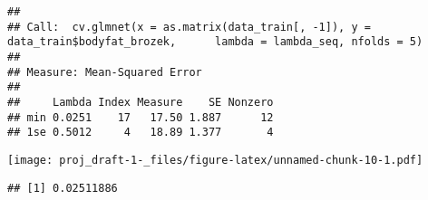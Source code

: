\documentclass[
]{article}
\newenvironment{Shaded}{\begin{snugshade}}{\end{snugshade}}
\newcommand{\AttributeTok}[1]{\textcolor[rgb]{0.77,0.63,0.00}{#1}}
\newcommand{\DecValTok}[1]{\textcolor[rgb]{0.00,0.00,0.81}{#1}}
\newcommand{\FunctionTok}[1]{\textcolor[rgb]{0.00,0.00,0.00}{#1}}
\newcommand{\NormalTok}[1]{#1}
\newcommand{\OtherTok}[1]{\textcolor[rgb]{0.56,0.35,0.01}{#1}}
\newcommand{\SpecialCharTok}[1]{\textcolor[rgb]{0.00,0.00,0.00}{#1}}
\begin{document}
\begin{Shaded}
\end{Shaded}

\begin{verbatim}
## 
## Call:  cv.glmnet(x = as.matrix(data_train[, -1]), y = data_train$bodyfat_brozek,      lambda = lambda_seq, nfolds = 5) 
## 
## Measure: Mean-Squared Error 
## 
##     Lambda Index Measure    SE Nonzero
## min 0.0251    17   17.50 1.887      12
## 1se 0.5012     4   18.89 1.377       4
\end{verbatim}

\begin{Shaded}
\end{Shaded}

\texttt{[image: proj\_draft-1-\_files/figure-latex/unnamed-chunk-10-1.pdf]}

\begin{Shaded}
\end{Shaded}

\begin{verbatim}
## [1] 0.02511886
\end{verbatim}
\end{document}
